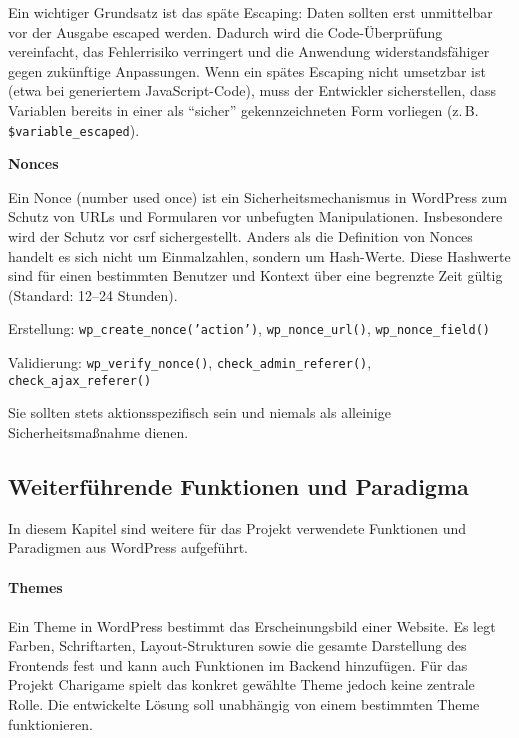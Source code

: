 Ein wichtiger Grundsatz ist das späte Escaping: Daten sollten erst unmittelbar vor der Ausgabe escaped werden.
Dadurch wird die Code-Überprüfung vereinfacht, das Fehlerrisiko verringert und die Anwendung widerstandsfähiger gegen zukünftige Anpassungen.
Wenn ein spätes Escaping nicht umsetzbar ist (etwa bei generiertem JavaScript-Code), muss der Entwickler sicherstellen, dass Variablen bereits in einer als \enquote{sicher} gekennzeichneten Form vorliegen (z.\,B. \texttt{\$variable\_escaped}).

\textbf{Nonces}

Ein Nonce (number used once) ist ein Sicherheitsmechanismus in WordPress zum Schutz von URLs und Formularen vor unbefugten Manipulationen.
Insbesondere wird der Schutz vor \gls{csrf} sichergestellt.
Anders als die Definition von Nonces handelt es sich nicht um Einmalzahlen, sondern um Hash-Werte.
Diese Hashwerte sind für einen bestimmten Benutzer und Kontext über eine begrenzte Zeit gültig (Standard: 12–24 Stunden).

Erstellung: \texttt{wp\_create\_nonce('action')}, \texttt{wp\_nonce\_url()}, \texttt{wp\_nonce\_field()}

Validierung: \texttt{wp\_verify\_nonce()}, \texttt{check\_admin\_referer()}, \texttt{check\_ajax\_referer()}

Sie sollten stets aktionsspezifisch sein und niemals als alleinige Sicherheitsmaßnahme dienen.




\subsection{Weiterführende Funktionen und Paradigma}
In diesem Kapitel sind weitere für das Projekt verwendete Funktionen und Paradigmen aus WordPress aufgeführt.
\\
\\
\textbf{Themes}\\\\
Ein Theme in WordPress bestimmt das Erscheinungsbild einer Website.
Es legt Farben, Schriftarten, Layout-Strukturen sowie die gesamte Darstellung des Frontends fest und kann auch Funktionen im Backend hinzufügen.
Für das Projekt Charigame spielt das konkret gewählte Theme jedoch keine zentrale Rolle.
Die entwickelte Lösung soll unabhängig von einem bestimmten Theme funktionieren.



